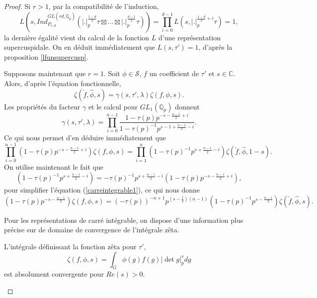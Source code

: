\begin{proof}
Si $r > 1$, par la compatibilité de l'induction,
\begin{equation}
L(s, Ind_{P_{r,d}}^{GL(rd, \mathbb{Q}_p)}(|.|_p^{\frac{1-d}{2}}\tau \boxtimes ... \boxtimes |.|_p^{\frac{d-1}{2}}\tau)) = \prod_{i=0}^{d-1} L(s, |.|_p^{\frac{1-d}{2}+i}\tau)=1,
\end{equation}
la dernière égalité vient du calcul de la fonction $L$ d'une représentation supercuspidale. On en déduit immédiatement que $L(s,\tau')=1$, d'après la proposition \ref{lfunsupercusp}.

Supposons maintenant que $r=1$. Soit $\phi \in \mathcal{S}$, $f$ un coefficient de $\tau'$ et $s \in \mathbb{C}$. Alors, d'après l'équation fonctionnelle,
\begin{equation}
\zeta(\check{f}, \hat{\phi}, s) = \gamma(s, \tau', \lambda)\zeta(f, \phi, s).
\end{equation}
Les propriétés du facteur $\gamma$ et le calcul pour $GL_1(\mathbb{Q}_p)$ donnent
\begin{equation}
\gamma(s, \tau', \lambda) = \prod_{i=0}^{n-1} \frac{1-\tau(p)p^{-s-\frac{n-1}{2}+i}}{1-\tau(p)^{-1}p^{s-1+\frac{n-1}{2}-i}}.
\end{equation}
Ce qui nous permet d'en déduire immédiatement que
\begin{equation}
\label{carreintegrable1}
\prod_{i=0}^{n-1}(1-\tau(p)p^{-s-\frac{n-1}{2}+i})\zeta(f, \phi, s) =
\prod_{i=1}^{n}(1-\tau(p)^{-1}p^{s+\frac{n-1}{2}-i})\zeta(\check{f}, \hat{\phi}, 1-s).
\end{equation}
On utilise maintenant le fait que
\begin{equation}
(1-\tau(p)^{-1}p^{s+\frac{n-1}{2}-i}) = -\tau(p)^{-1}p^{s+\frac{n-1}{2}-i}(1-\tau(p)p^{-s-\frac{n-1}{2}+i}),
\end{equation}
pour simplifier l'équation (\ref{carreintegrable1}), ce qui nous donne
\begin{equation}
\label{carreintegrable2}
(1-\tau(p)p^{-s-\frac{n-1}{2}})\zeta(f, \phi, s) = (-\tau(p))^{-n+1}
p^{(s-\frac{1}{2})(n-1)}(1-\tau(p)^{-1}p^{s-\frac{n-1}{2}})\zeta(\check{f}, \hat{\phi}, s).
\end{equation}

Pour les représentations de carré intégrable, on dispose d'une information plus précise sur de domaine de convergence de l'intégrale zêta.
\begin{lemme}
L'intégrale définissant la fonction zêta pour $\tau'$,
\begin{equation}
\zeta(f, \phi, s) = \int_{G} \phi(g)f(g)|\det g|_p^s dg
\end{equation}
est absolument convergente pour $Re(s) > 0$.
\end{lemme}


\end{proof}
